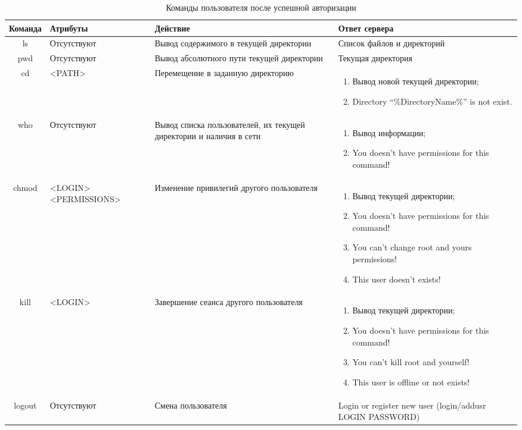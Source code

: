 \begin{table}[H]
	\centering
	\begin{tabular}{|c|M{3cm}|M{5cm}|M{7cm}|}
		\hline Команда               & Атрибуты   & Действие  & Ответ сервера	\\
		\hline ls               & Отсутствуют & Вывод содержимого в текущей директории  & Список файлов и директорий		\\
		\hline pwd              & Отсутствуют & Вывод абсолютного пути текущей директории & Текущая директория			\\
		\hline cd              & <PATH> & Перемещение в заданную директорию & \begin{enumerate}
	\item Вывод новой текущей директории;
	\item Directory ``\%DirectoryName\%'' is not exist.
\end{enumerate}			\\
		\hline who              & Отсутствуют & Вывод списка пользователей, их текущей директории и наличия в сети & \begin{enumerate}
	\item Вывод информации;
	\item You doesn't have permissions for this command!
\end{enumerate}			\\
		\hline chmod              & <LOGIN> <PERMISSIONS> & Изменение привилегий другого пользователя & \begin{enumerate}
	\item Вывод текущей директории;
	\item You doesn't have permissions for this command!
	\item You can't change root and yours permissions!
	\item This user doesn't exists!
\end{enumerate}			\\
		\hline kill              & <LOGIN> & Завершение сеанса другого пользователя & \begin{enumerate}
	\item Вывод текущей директории;
	\item You doesn't have permissions for this command!
	\item You can't kill root and yourself!
	\item This user is offline or not exists!
\end{enumerate}			\\
		\hline logout              & Отсутствуют & Смена пользователя & Login or register new user (login/addusr LOGIN PASSWORD)			\\ \hline
	\end{tabular}
	\caption{Команды пользователя после успешной авторизации}
	\label{tab:tcp_after}
\end{table}

